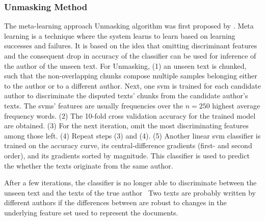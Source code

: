 



\subsubsection{Unmasking Method}
\label{subsec:unmasking}

The meta-learning approach Unmasking algorithm was first proposed by \citet{koppel_authorship_2004}.
Meta learning is a technique where the system learns to learn based on learning successes and failures.
It is based on the idea that omitting discriminant features and the consequent drop in accuracy of the classifier can be used for inference of the author of the unseen text.
For Unmasking, (1) an unseen text is chunked, such that the non-overlapping chunks compose multiple samples belonging either to the author or to a different author.
Next, one \ac{svm} is trained for each candidate author to discriminate the disputed texts' chunks from the candidate author's texts.
The \acp{svm}' features are usually frequencies over the $n=250$ highest average frequency words.
(2) The 10-fold cross validation accuracy for the trained model are obtained.
(3) For the next iteration, omit the most discriminating features among those left.
(4) Repeat steps (3) and (4).
(5) Another linear \ac{svm} classifier is trained on the accuracy curve, its central-difference gradients (first- and second order), 
and its gradients sorted by magnitude.
This classifier is used to predict the whether the texts originate from the same author.

After a few iterations, the classifier is no longer able to discriminate between the unseen text and the texts of the true author~\citep{stein_intrinsic_2011,tyo_state_2022,bevendorff_divergence_based_2020,koppel_authorship_2004,stamatatos_survey_2009} 
Two texts are probably written by different authors if the differences between are robust to changes in the underlying feature set used to represent the documents.

